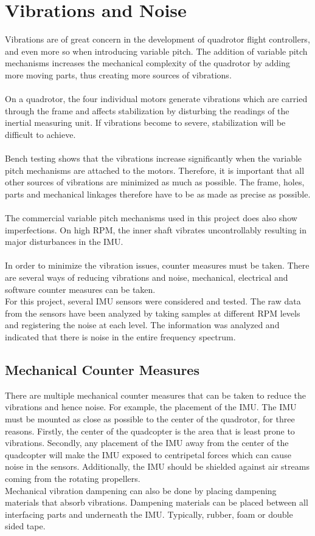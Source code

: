 \chapter{Vibrations and Noise}
Vibrations are of great concern in the development of quadrotor flight controllers, and even more so when introducing variable pitch. The addition of variable pitch mechanisms increases the mechanical complexity of the quadrotor by adding more moving parts, thus creating more sources of vibrations.
\\
\\
On a quadrotor, the four individual motors generate vibrations which are carried through the frame and affects stabilization by disturbing the readings of the inertial measuring unit. If vibrations become to severe, stabilization will be difficult to achieve.
\\
\\
Bench testing shows that the vibrations increase significantly when the variable pitch mechanisms are attached to the motors. Therefore, it is important that all other sources of vibrations are minimized as much as possible. The frame, holes, parts and mechanical linkages therefore have to be as made as precise as possible. 
\\
\\
The commercial variable pitch mechanisms used in this project does also show imperfections. On high RPM, the inner shaft vibrates uncontrollably resulting in major disturbances in the IMU.
\\ 
\\
In order to minimize the vibration issues, counter measures must be taken. There are several ways of reducing vibrations and noise, mechanical, electrical and software counter measures can be taken. 
\\
For this project, several IMU sensors were considered and tested. The raw data from the sensors have been analyzed by taking samples at different RPM levels and registering the noise at each level. The information was analyzed and indicated that there is noise in the entire frequency spectrum.  

\section{Mechanical Counter Measures}
There are multiple mechanical counter measures that can be taken to reduce the vibrations and hence noise. 
For example, the placement of the IMU. The IMU must be mounted as close as possible to the center of the quadrotor, for three reasons. Firstly, the center of the quadcopter is the area that is least prone to vibrations. Secondly, any placement of the IMU away from the center of the quadcopter will make the IMU exposed to centripetal forces which can cause noise in the sensors. Additionally, the IMU should be shielded against air streams coming from the rotating propellers.
\\
Mechanical vibration dampening can also be done by placing dampening materials that absorb vibrations. Dampening materials can be placed between all interfacing parts and underneath the IMU. Typically, rubber, foam or double sided tape. \bigskip

